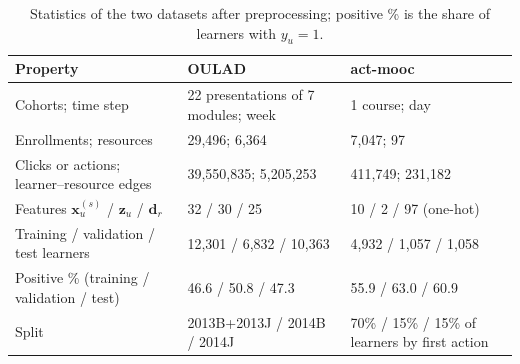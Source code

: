 \begin{table}[H]
\tablesize{\footnotesize}
\caption{Statistics of the two datasets after preprocessing; positive \% is the share of learners with $y_u=1$.}
\label{tab:datasets}
\renewcommand{\arraystretch}{1.1}
\begin{tabularx}{\textwidth}{@{}p{5.2cm}LL@{}}
\toprule
\textbf{Property} & \textbf{OULAD} & \textbf{act-mooc}\\
\midrule
Cohorts; time step & 22 presentations of 7 modules; week & 1 course; day\\
Enrollments; resources & 29,496; 6,364 & 7,047; 97\\
Clicks or actions; learner--resource edges & 39,550,835; 5,205,253 & 411,749; 231,182\\
Features $\mathbf{x}_u^{(s)}$ / $\mathbf{z}_u$ / $\mathbf{d}_r$ & 32 / 30 / 25 & 10 / 2 / 97 (one-hot)\\
Training / validation / test learners & 12,301 / 6,832 / 10,363 & 4,932 / 1,057 / 1,058\\
Positive \% (training / validation / test) & 46.6 / 50.8 / 47.3 & 55.9 / 63.0 / 60.9\\
Split & 2013B+2013J / 2014B / 2014J & 70\% / 15\% / 15\% of learners by first action\\
\bottomrule
\end{tabularx}
\end{table}
